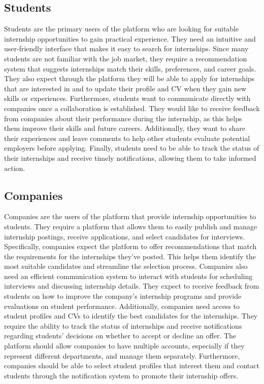 \subsection{Students}
Students are the primary users of the platform who are looking for suitable internship opportunities to gain practical experience. They need an intuitive and 
user-friendly interface that makes it easy to search for internships. Since many students are not familiar with the job market, they require a recommendation 
system that suggests internships match their skills, preferences, and career goals. They also expect through the platform they will be able to apply for internships
that are interested in and to update their profile and CV when they gain new skills or experiences.
Furthermore, students want to communicate directly with companies once a collaboration is established. They would like to receive feedback from companies about 
their performance during the internship, as this helps them improve their skills and future careers. Additionally, they want to share their experiences and 
leave comments to help other students evaluate potential employers before applying.
Finally, students need to be able to track the status of their internships and receive timely notifications, allowing them to take informed action.

\subsection{Companies}
Companies are the users of the platform that provide internship opportunities to students. They require a platform that allows them to easily publish and 
manage internship postings, receive applications, and select candidates for interviews. Specifically, companies expect the platform to offer recommendations 
that match the requirements for the internships they’ve posted. This helps them identify the most suitable candidates and streamline the selection process.
Companies also need an efficient communication system to interact with students for scheduling interviews and discussing internship details. 
They expect to receive feedback from students on how to improve the company’s internship programs and provide evaluations on student performance.
Additionally, companies need access to student profiles and CVs to identify the best candidates for the internships. 
They require the ability to track the status of internships and receive notifications regarding students' decisions on whether to accept or decline an offer.
The platform should allow companies to have multiple accounts, especially if they represent different departments, and manage them separately. 
Furthermore, companies should be able to select student profiles that interest them and contact students through the notification system to promote their 
internship offers.

